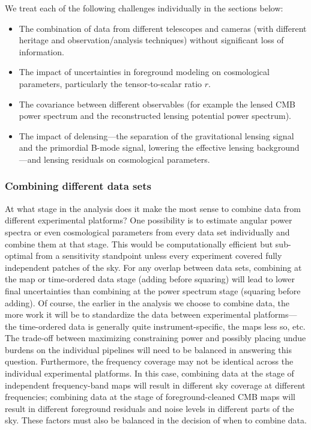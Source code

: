We treat each of the following challenges individually in the sections below:
\begin{itemize}
\item{The combination of data from different telescopes and cameras (with different heritage 
and observation/analysis techniques) without significant loss of information.}
\item{The impact of uncertainties in foreground modeling on cosmological parameters, particularly the tensor-to-scalar ratio $r$.}
\item{The covariance between different observables (for example the lensed CMB power spectrum and the reconstructed lensing potential power spectrum).}
\item{The impact of delensing---the separation of the gravitational lensing signal and the primordial B-mode signal, lowering the effective lensing background---and lensing residuals on cosmological parameters.} 
\end{itemize}


\subsubsection{Combining different data sets}
\label{se:combine}
At what stage in the analysis does it make the most sense to combine data from different experimental platforms? 
One possibility is to estimate
angular power spectra or even cosmological parameters from every data set individually and combine them at that stage. This would
be computationally efficient but sub-optimal from a sensitivity standpoint unless every experiment
covered fully independent patches of the sky. For any overlap between data sets, combining at
the map or time-ordered data stage (adding before squaring) will lead to lower final uncertainties
than combining at the power spectrum stage (squaring before adding). Of course, the earlier in the analysis
we choose to combine data, the more work it will be to standardize the data between experimental platforms---the
time-ordered data is generally quite instrument-specific, the maps less so, etc. The trade-off between
maximizing constraining power and possibly placing undue burdens on the individual  
pipelines will need to be balanced in answering this question.
Furthermore, the frequency coverage may not be identical across the individual experimental platforms.
In this case, combining data at the stage of independent frequency-band maps will result in
different sky coverage at different frequencies; combining data at the stage of foreground-cleaned
CMB maps will result in different foreground residuals and noise levels in different parts of the sky.
These factors must also be balanced in the decision of when to combine data.

